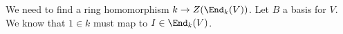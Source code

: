 We need to find a ring homomorphism $k \to Z(\End_k(V))$. Let $B$ a basis for $V$. We know that $1\in k$ must map to $I \in \End_k(V)$. 